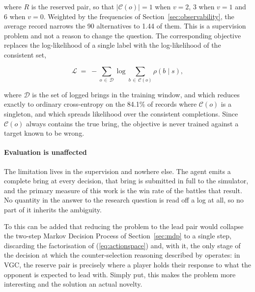 \documentclass[conference]{IEEEtran}
\begin{document}
\noindent where $R$ is the reserved pair, so that $|\mathcal{C}(o)| = 1$ when $v=2$, $3$ when $v=1$ and $6$
when $v=0$. Weighted by the frequencies of Section~\ref{sec:observability}, the
average record narrows the 90 alternatives to 1.44 of them. This is a
supervision problem and not a reason to change the question. The corresponding
objective replaces the log-likelihood of a single label with the log-likelihood
of the consistent set,

\begin{equation}
\mathcal{L} \;=\; -\sum_{o \,\in\, \mathcal{D}} \log \!\!\sum_{b \,\in\, \mathcal{C}(o)} \rho(b \mid s) ,
\label{eq:partial}
\end{equation}

\noindent where $\mathcal{D}$ is the set of logged brings in the training
window, and which reduces exactly to ordinary cross-entropy on the 84.1\% of
records where $\mathcal{C}(o)$ is a singleton, and which spreads likelihood over
the consistent completions. Since $\mathcal{C}(o)$ always contains the true
bring, the objective is never trained against a target known to be wrong.

\paragraph{Evaluation is unaffected} The limitation lives in the supervision
and nowhere else. The agent emits a complete bring at every decision, that
bring is submitted in full to the simulator, and the primary measure of this
work is the win rate of the battles that result. No quantity in the answer to
the research question is read off a log at all, so no part of it inherits the
ambiguity.

To this can be added that reducing the problem to the lead pair would collapse
the two-step Markov Decision Process of Section~\ref{sec:mdp} to a single step,
discarding the factorisation of (\ref{eq:actionspace}) and, with it, the only
stage of the decision at which the counter-selection reasoning described by
\cite{crane2021} operates: in VGC, the reserve pair is precisely where a player holds
their response to what the opponent is expected to lead with. Simply put, this makes the problem more interesting and the solution an actual novelty.

\end{document}
